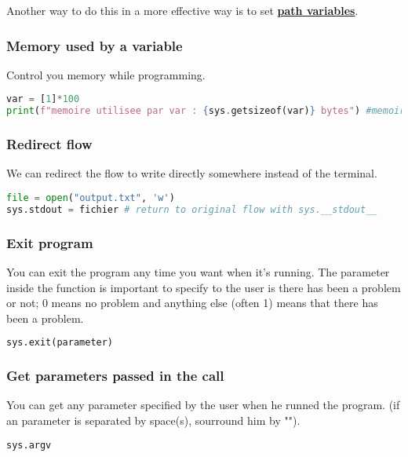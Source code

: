 \documentclass[a4paper, 12pt, titlepage]{scrartcl} %
\begin{document}
Another way to do this in a more effective way is to set \textbf{\hyperref[subsec:PathVariables]{path variables}}.

\subsubsection{Memory used by a variable}
Control you memory while programming. 
\begin{lstlisting}[language=Python]
var = [1]*100
print(f"memoire utilisee par var : {sys.getsizeof(var)} bytes") #memoire utilisee par var : 856 bytes
\end{lstlisting} \vspace{5mm}

\subsubsection{Redirect flow}
We can redirect the flow to write directly somewhere instead of the terminal.
\begin{lstlisting}[language=Python]
file = open("output.txt", 'w')
sys.stdout = fichier # return to original flow with sys.__stdout__
\end{lstlisting} \vspace{5mm}

\subsubsection{Exit program}
You can exit the program any time you want when it's running. The parameter inside the function is important to specify to the user is there has been a problem or not; 0 means no problem and anything else (often 1) means that there has been a problem.
\begin{lstlisting}[language=Python]
sys.exit(parameter)
\end{lstlisting} \vspace{5mm}

\subsubsection{Get parameters passed in the call}
You can get any parameter specified by the user when he runned the program. (if an parameter is separated by space(s), sourround him by "").
\begin{lstlisting}[language=Python]
sys.argv
\end{lstlisting} \vspace{5mm}
\end{document}
